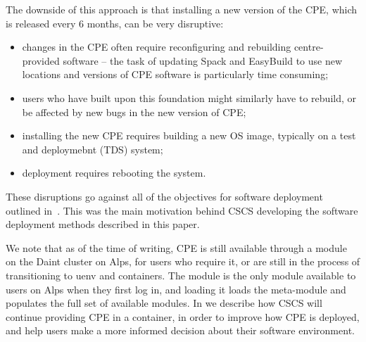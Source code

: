 The downside of this approach is that installing a new version of the CPE, which is released every 6 months, can be very disruptive:
\begin{itemize}
    \item changes in the CPE often require reconfiguring and rebuilding centre-provided software -- the task of updating Spack and EasyBuild to use new locations and versions of CPE software is particularly time consuming;
    \item users who have built upon this foundation might similarly have to rebuild, or be affected by new bugs in the new version of CPE;
    \item installing the new CPE requires building a new OS image, typically on a test and deploymebnt (TDS) system;
    \item deployment requires rebooting the system.
\end{itemize}
These disruptions go against all of the objectives for software deployment outlined in~.
This was the main motivation behind CSCS developing the software deployment methods described in this paper.

We note that as of the time of writing, CPE is still available through a  module on the Daint cluster on Alps, for users who require it, or are still in the process of transitioning to uenv and containers.
The  module is the only module available to users on Alps when they first log in, and loading it loads the  meta-module and populates the full set of available modules.
In  we describe how CSCS will continue providing CPE in a container, in order to improve how CPE is deployed, and help users make a more informed decision about their software environment.
